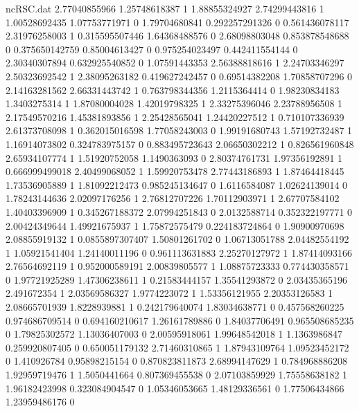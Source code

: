 \begin{filecontents}{ncRSC.dat}
2.77040855966 1.25748618387 1
1.88855324927 2.74299443816 1
1.00528692435 1.07753771971 0
1.79704680841 0.292257291326 0
0.561436078117 2.31976258003 1
0.315595507446 1.64368488576 0
2.68098803048 0.853878548688 0
0.375650142759 0.85004613427 0
0.975254023497 0.442411554144 0
2.30340307894 0.632925540852 0
1.07591443353 2.56388818616 1
2.24703346297 2.50323692542 1
2.38095263182 0.419627242457 0
0.69514382208 1.70858707296 0
2.14163281562 2.66331443742 1
0.763798344356 1.2115364414 0
1.98230834183 1.3403275314 1
1.87080004028 1.42019798325 1
2.33275396046 2.23788956508 1
2.17549570216 1.45381893856 1
2.25428565041 1.24420227512 1
0.710107336939 2.61373708098 1
0.362015016598 1.77058243003 0
1.99191680743 1.57192732487 1
1.16914073802 0.324783975157 0
0.883495723643 2.06650302212 1
0.826561960848 2.65934107774 1
1.51920752058 1.1490363093 0
2.80374761731 1.97356192891 1
0.666999499018 2.40499068052 1
1.59920753478 2.77443186893 1
1.87464418445 1.73536905889 1
1.81092212473 0.985245134647 0
1.6116584087 1.02624139014 0
1.78243144636 2.02097176256 1
2.76812707226 1.70112903971 1
2.67707584102 1.40403396909 1
0.345267188372 2.07994251843 0
2.0132588714 0.352322197771 0
2.00424349644 1.49921675937 1
1.75872575479 0.224183724864 0
1.90900970698 2.08855919132 1
0.0855897307407 1.50801261702 0
1.06713051788 2.04482554192 1
1.05921541404 1.24140011196 0
0.961113631883 2.25270127972 1
1.87414093166 2.76564692119 1
0.952000589191 2.00839805577 1
1.08875723333 0.774430358571 0
1.97721925289 1.47306238611 1
0.21583444157 1.35541293872 0
2.03435365196 2.491672354 1
2.03569586327 1.9774223072 1
1.53356121955 2.20353126583 1
2.08665701939 1.8228939881 1
0.242179640074 1.83034638771 0
0.457568260225 0.974686709514 0
0.694160210617 1.26161789886 0
1.84037706491 0.965508685235 0
1.79825302572 1.13036407003 0
2.00595918061 1.99648542018 1
1.1363986847 0.259920807405 0
0.650051179132 2.71460310865 1
1.87943109764 1.09523452172 0
1.410926784 0.95898215154 0
0.870823811873 2.68994147629 1
0.784968886208 1.92959719476 1
1.5050441664 0.807369455538 0
2.07103859929 1.75558638182 1
1.96182423998 0.323084904547 0
1.05346053665 1.48129336561 0
1.77506434866 1.23959486176 0
\end{filecontents}
